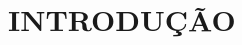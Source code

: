 \documentclass[
	12pt,				%
	openright,			%
	oneside,			%
	a4paper,			%
	english,			%
	french,				%
	spanish,			%
	brazil,				%
	]{abntex2}
\begin{document}

\tableofcontents*





\textual

\setcounter{chapter}{0}
\chapter{INTRODUÇÃO}
\label{ch: Introdução}
\end{document}
